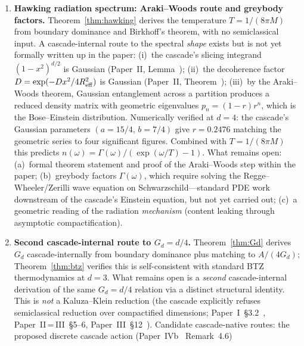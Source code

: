 \documentclass[12pt,a4paper]{article}
\begin{document}
\begin{enumerate}
the lattice whose equilibrium content density per unit boundary area is
$V_d/\Omega_{d-1} = 1/d$ independent of the total area, or a
cascade-internal theorem that $S = A/d$ is the unique entropy
assignment consistent with boundary dominance plus the cascade's
content-equals-area primitive. Load-bearing on Bekenstein--Hawking,
Hawking temperature (Theorem~\ref{thm:hawking}), and the BTZ
cross-check (Theorem~\ref{thm:btz}).
\item \textbf{Hawking radiation spectrum: Araki--Woods route and
greybody factors.} Theorem~\ref{thm:hawking} derives the temperature
$T = 1/(8\pi M)$ from boundary dominance and Birkhoff's theorem, with
no semiclassical input. A cascade-internal route to the spectral
\emph{shape} exists but is not yet formally written up in the paper:
(i)~the cascade's slicing integrand $(1-x^2)^{d/2}$ is Gaussian
(Paper~II, Lemma~); (ii)~the decoherence factor
$D = \exp(-D x^2/4R_{\rm eff}^2)$ is Gaussian (Paper~II, Theorem~); (iii)~by the Araki--Woods theorem, Gaussian
entanglement across a partition produces a reduced density matrix
with geometric eigenvalues $p_n = (1-r)r^n$, which is the
Bose--Einstein distribution. Numerically verified at $d=4$: the
cascade's Gaussian parameters $(a=15/4,\,b=7/4)$ give $r=0.2476$
matching the geometric series to four significant figures. Combined
with $T=1/(8\pi M)$ this predicts $n(\omega) = \Gamma(\omega)/
(\exp(\omega/T)-1)$. What remains open: (a)~formal theorem statement
and proof of the Araki--Woods step within the paper; (b)~greybody
factors $\Gamma(\omega)$, which require solving the
Regge--Wheeler/Zerilli wave equation on Schwarzschild---standard PDE
work downstream of the cascade's Einstein equation, but not yet
carried out; (c)~a geometric reading of the radiation
\emph{mechanism} (content leaking through asymptotic
compactification).
\item \textbf{Second cascade-internal route to $G_d = d/4$.}
Theorem~\ref{thm:Gd} derives $G_d$ cascade-internally from boundary
dominance plus matching to $A/(4G_d)$; Theorem~\ref{thm:btz} verifies
this is self-consistent with standard BTZ thermodynamics at $d=3$. What
remains open is a \emph{second} cascade-internal derivation of the same
$G_d = d/4$ relation via a distinct structural identity. This is
\emph{not} a Kaluza--Klein reduction (the cascade explicitly refuses
semiclassical reduction over compactified dimensions;
Paper~I~\S3.2~\cite{part1}, Paper~II\,=\,III~\S5--6,
Paper~III~\S12~\cite{part3}). Candidate cascade-native routes: the
proposed discrete cascade action (Paper~IVb~\cite{part4b} Remark~4.6)

\end{enumerate}
\end{document}
